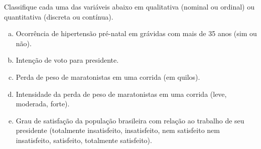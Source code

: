 %
%


\begin{exercicioBanco}[\valorquestao]
Classifique cada uma das variáveis abaixo em qualitativa (nominal ou ordinal) ou quantitativa
(discreta ou contínua).
%
\begin{enumerate}[(a)]
    \item Ocorrência de hipertensão pré-natal em grávidas com mais de 35 anos (sim ou não).
    \item Intenção de voto para presidente.
    \item Perda de peso de maratonistas em uma corrida (em quilos).
    \item Intensidade da perda de peso de maratonistas em uma corrida (leve, moderada, forte).
    \item Grau de satisfação da população brasileira com relação ao trabalho de seu presidente (totalmente insatisfeito, insatisfeito, nem satisfeito nem insatisfeito, satisfeito, totalmente satisfeito).
\end{enumerate}
%
\end{exercicioBanco}

